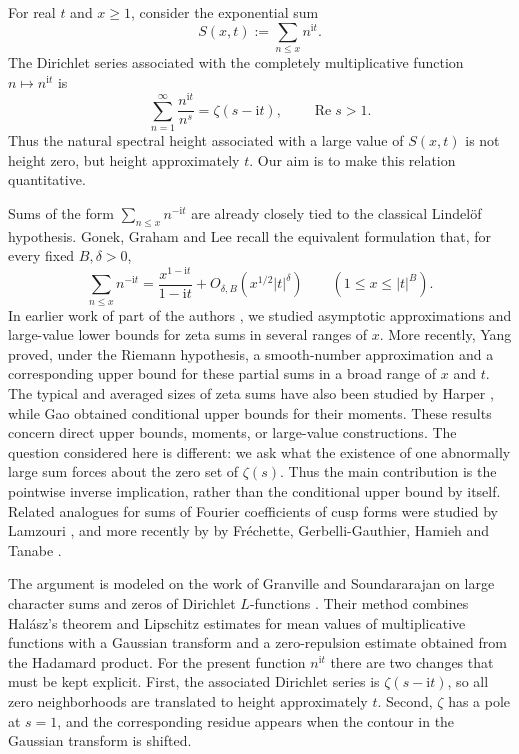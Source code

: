 \documentclass[12pt,reqno]{amsart}
\theoremstyle{remark}
\numberwithin{equation}{section}
\newcommand{\Ree}{\operatorname{Re}}
\newcommand{\ii}{\mathrm i}
\begin{document}
For real $t$ and $x\ge1$, consider the exponential sum
\begin{equation}\label{eq:def-S}
S(x,t):=\sum_{n\le x}n^{\ii t}.
\end{equation}
The Dirichlet series associated with the completely multiplicative function $n\mapsto n^{\ii t}$ is
\[
\sum_{n=1}^{\infty}\frac{n^{\ii t}}{n^s}=\zeta(s-\ii t),
\qquad \Ree s>1.
\]
Thus the natural spectral height associated with a large value of $S(x,t)$ is not height zero, but height approximately $t$.  Our aim is to make this relation quantitative.

Sums of the form $\sum_{n\le x}n^{-\ii t}$ are already closely tied to the classical Lindel\"of hypothesis.  Gonek, Graham and Lee \cite{GGL20} recall the equivalent formulation that, for every fixed $B,\delta>0$,
\[
\sum_{n\le x}n^{-\ii t}
=\frac{x^{1-\ii t}}{1-\ii t}+O_{\delta,B}(x^{1/2}|t|^{\delta})
\qquad (1\le x\le |t|^B).
\]
In  earlier work of  part of the authors \cite{DWZ23}, we studied asymptotic approximations and large-value lower bounds for zeta sums in several ranges of $x$.  More recently, Yang \cite[Theorem~5]{Yang24} proved, under the Riemann hypothesis, a smooth-number approximation and a corresponding upper bound for these partial sums in a broad range of $x$ and $t$.  The typical and averaged sizes of zeta sums have also been studied by Harper \cite{Harper23}, while Gao \cite{Gao26} obtained conditional upper bounds for their moments.  These results concern direct upper bounds, moments, or large-value constructions.  The question considered here is different: we ask what the existence of one abnormally large sum forces about the zero set of $\zeta(s)$.  Thus the main contribution is the pointwise inverse implication, rather than the conditional upper bound by itself. Related analogues for sums of Fourier coefficients of cusp forms were studied by Lamzouri \cite{Lam}, and more recently by by Fréchette, Gerbelli-Gauthier, Hamieh and Tanabe \cite{FGHT}.

The argument is modeled on the work of Granville and Soundararajan on large character sums and zeros of Dirichlet $L$-functions \cite{GS18}.  Their method combines Hal\'asz's theorem and Lipschitz estimates for mean values of multiplicative functions with a Gaussian transform and a zero-repulsion estimate obtained from the Hadamard product.  For the present function $n^{\ii t}$ there are two changes that must be kept explicit.  First, the associated Dirichlet series is $\zeta(s-\ii t)$, so all zero neighborhoods are translated to height approximately $t$.  Second, $\zeta$ has a pole at $s=1$, and the corresponding residue appears when the contour in the Gaussian transform is shifted.
\end{document}
